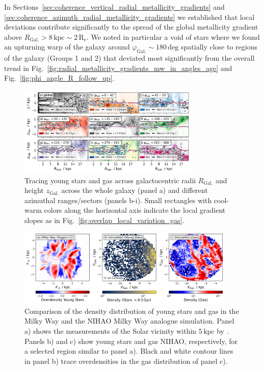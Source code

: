 \documentclass[fleqn,usenatbib]{mnras}
\begin{document}
In Sections~\ref{sec:coherence_vertical_radial_metallicity_gradients} and \ref{sec:coherence_azimuth_radial_metallicity_gradients} we established that local deviations contribute significantly to the spread of the global metallicity gradient above $R_\mathrm{Gal.} > 8\,\mathrm{kpc} \sim 2\,\mathrm{R_e}$. We noted in particular a void of stars where we found an upturning warp of the galaxy around $\varphi_\mathrm{Gal.} \sim 180\,\mathrm{deg}$ spatially close to regions of the galaxy (Groups 1 and 2) that deviated most significantly from the overall trend in Fig.~\ref{fig:radial_metallicity_gradients_mw_in_angles_age} and Fig.~\ref{fig:phi_angle_R_follow_up}.

\begin{figure}
    \centering
    \includegraphics[width=0.77\textwidth]{figures/tracing_young_stars_and_gas_in_angles.png}
    \caption{Tracing young stars and gas across galactocentric radii $R_\mathrm{Gal.}$ and height $z_\mathrm{Gal.}$ across the whole galaxy (panel a) and different azimuthal ranges/sectors (panels b-i). Small rectangles with cool-warm colors along the horizontal axis indicate the local gradient slopes as in Fig.~\ref{fig:overlap_local_variation_gas}.}
    \label{fig:tracing_young_stars_and_gas_in_angles}
\end{figure}

\begin{figure}
    \centering
    \includegraphics[width=0.925\textwidth]{figures/overdensities_mw_vs_nihao.png}
    \caption{Comparison of the density distribution of young stars and gas in the Milky Way and the NIHAO Milky Way analogue simulation. Panel a) shows the measurements of the Solar vicinity within $5\,\mathrm{kpc}$ by \citet{Poggio2021}. Panels b) and c) show young stars and gas NIHAO, respectively, for a selected region similar to panel a). Black and white contour lines in panel b) trace overdensities in the gas distribution of panel c).}
    \label{fig:overdensities_mw_vs_nihao}
\end{figure}
\end{document}
